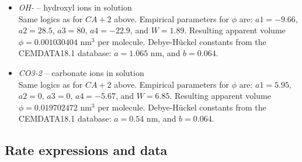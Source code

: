 \documentclass[12pt]{paper}    %
\begin{document}
\begin{itemize}
%
\item \textit{OH-} -- hydroxyl ions in solution \\
Same logics as for $CA+2$ above. Empirical parameters for $\phi$ are: $a1 = -9.66$, $a2 = 28.5$, $a3 = 80$, $a4 = -22.9$, and $W = 1.89$. Resulting apparent volume $\phi = 0.001030404$ nm$^3$ per molecule. Debye-H\"uckel constants from the CEMDATA18.1 database: $a = 1.065$ nm, and $b = 0.064$.
%
\item \textit{CO3-2} -- carbonate ions in solution \\
Same logics as for $CA+2$ above. Empirical parameters for $\phi$ are: $a1 = 5.95$, $a2 = 0$, $a3 = 0$, $a4 = -5.67$, and $W = 6.85$. Resulting apparent volume $\phi = 0.019702472$ nm$^3$ per molecule. Debye-H\"uckel constants from the CEMDATA18.1 database: $a =0.54$ nm, and $b = 0.064$.
\end{itemize}




\subsection{Rate expressions and data}
\end{document}
